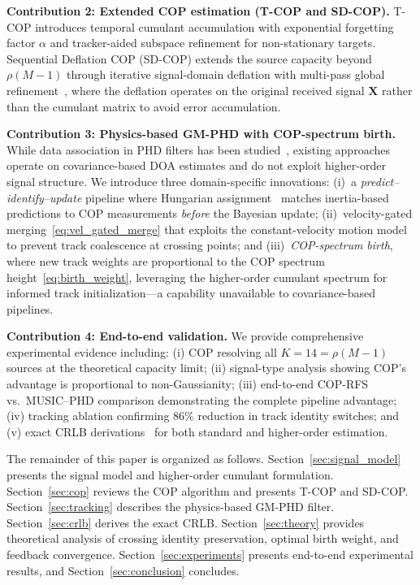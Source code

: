 \documentclass[journal]{IEEEtran}
\newcommand{\mat}[1]{\mathbf{#1}}
\begin{document}
\textbf{Contribution 2: Extended COP estimation (T-COP and SD-COP).}
T-COP introduces temporal cumulant accumulation with exponential forgetting factor $\alpha$ and tracker-aided subspace refinement for non-stationary targets. Sequential Deflation COP (SD-COP) extends the source capacity beyond $\rho(M{-}1)$ through iterative signal-domain deflation with multi-pass global refinement~\cite{andrews2005sic}, where the deflation operates on the original received signal $\mat{X}$ rather than the cumulant matrix to avoid error accumulation.

\textbf{Contribution 3: Physics-based GM-PHD with COP-spectrum birth.}
While data association in PHD filters has been studied~\cite{panta2009gmphd,georgescu2012phd_doa}, existing approaches operate on covariance-based DOA estimates and do not exploit higher-order signal structure. We introduce three domain-specific innovations: (i)~a \emph{predict--identify--update} pipeline where Hungarian assignment~\cite{kuhn1955hungarian} matches inertia-based predictions to COP measurements \emph{before} the Bayesian update; (ii)~velocity-gated merging~\eqref{eq:vel_gated_merge} that exploits the constant-velocity motion model to prevent track coalescence at crossing points; and (iii)~\emph{COP-spectrum birth}, where new track weights are proportional to the COP spectrum height~\eqref{eq:birth_weight}, leveraging the higher-order cumulant spectrum for informed track initialization---a capability unavailable to covariance-based pipelines.

\textbf{Contribution 4: End-to-end validation.}
We provide comprehensive experimental evidence including: (i) COP resolving all $K{=}14{=}\rho(M{-}1)$ sources at the theoretical capacity limit; (ii) signal-type analysis showing COP's advantage is proportional to non-Gaussianity; (iii) end-to-end COP-RFS vs.~MUSIC--PHD comparison demonstrating the complete pipeline advantage; (iv) tracking ablation confirming $86\%$ reduction in track identity switches; and (v) exact CRLB derivations~\cite{stoica1989music,stoica1990performance} for both standard and higher-order estimation.

The remainder of this paper is organized as follows. Section~\ref{sec:signal_model} presents the signal model and higher-order cumulant formulation. Section~\ref{sec:cop} reviews the COP algorithm and presents T-COP and SD-COP. Section~\ref{sec:tracking} describes the physics-based GM-PHD filter. Section~\ref{sec:crlb} derives the exact CRLB. Section~\ref{sec:theory} provides theoretical analysis of crossing identity preservation, optimal birth weight, and feedback convergence. Section~\ref{sec:experiments} presents end-to-end experimental results, and Section~\ref{sec:conclusion} concludes.
\end{document}
